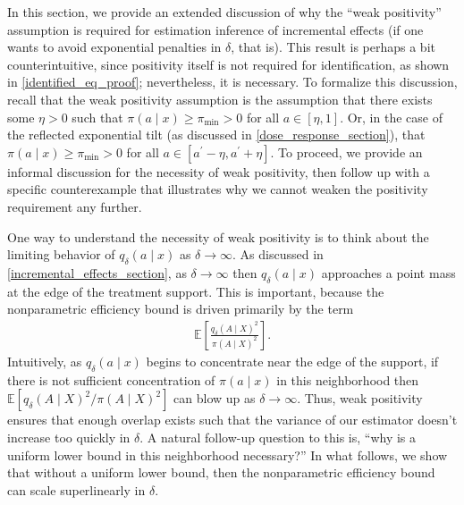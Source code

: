 \documentclass[11pt,twoside]{article}
\theoremstyle{definition}
\theoremstyle{remark}
\begin{document}
In this section, we provide an extended discussion of why the ``weak positivity'' assumption is required for estimation inference of incremental effects (if one wants to avoid exponential penalties in $\delta$, that is). This result is perhaps a bit counterintuitive, since positivity itself is not required for identification, as shown in \cref{identified_eq_proof}; nevertheless, it is necessary. To formalize this discussion, recall that the weak positivity assumption is the assumption that there exists some $\eta > 0$ such that $\pi(a \mid x) \geq \pi_{\min} > 0$ for all $a \in [\eta, 1]$. Or, in the case of the reflected exponential tilt (as discussed in \cref{dose_response_section}), that  $\pi(a \mid x) \geq \pi_{\min} > 0$ for all $a \in [a^\prime - \eta, a^\prime + \eta]$. To proceed, we provide an informal discussion for the necessity of weak positivity, then follow up with a specific counterexample that illustrates why we cannot weaken the positivity requirement any further.

One way to understand the necessity of weak positivity is to think about the limiting behavior of $q_\delta(a \mid x)$ as $\delta \to \infty$. As discussed in \cref{incremental_effects_section}, as $\delta \to \infty$ then $q_\delta(a \mid x)$ approaches a point mass at the edge of the treatment support. This is important, because the nonparametric efficiency bound is driven primarily by the term
\begin{align*}
     \mathbb{E}\left[\frac{q_\delta(A \mid X)^2}{\pi(A \mid X)^2}\right].
\end{align*}
Intuitively, as $q_\delta(a \mid x)$ begins to concentrate near the edge of the support, if there is not sufficient concentration of $\pi(a \mid x)$ in this neighborhood then $\mathbb{E}\left[q_\delta(A \mid X)^2 / \pi(A \mid X)^2\right]$ can blow up as $\delta \to \infty$. Thus, weak positivity ensures that enough overlap exists such that the variance of our estimator doesn't increase too quickly in $\delta$. A natural follow-up question to this is, ``why is a uniform lower bound in this neighborhood necessary?'' In what follows, we show that without a uniform lower bound, then the nonparametric efficiency bound can scale superlinearly in $\delta$.
\end{document}
